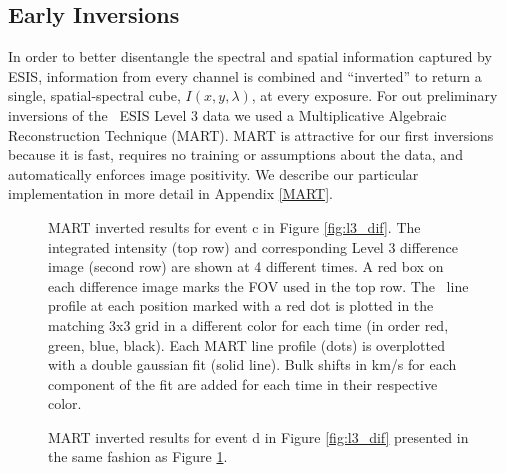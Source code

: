     
    \subsection{Early Inversions} \label{sec:inversions}
    	In order to better disentangle the spectral and spatial information captured by ESIS, information from every channel is combined and ``inverted'' to return a single, spatial-spectral cube, $I(x,y,\lambda)$, at every exposure.
    	For out preliminary inversions of the \ov \  ESIS Level 3 data we used a Multiplicative Algebraic Reconstruction Technique (MART).
    	MART is attractive for our first inversions because it is fast, requires no training or assumptions about the data, and automatically enforces image  positivity.
    	We describe our particular implementation in more detail in Appendix \ref{MART}.
    	
    	\begin{figure}[htb!]
    		\centering
    		\caption{MART inverted results for event c in Figure \ref{fig:l3_dif}. The integrated intensity (top row) and corresponding Level 3 difference image (second row) are shown at 4 different times. A red box on each difference image marks the FOV used in the top row.  The \ov \ line profile at each position marked with a red dot is plotted in the matching 3x3 grid in a different color for each time (in order red, green, blue, black). Each MART line profile (dots) is overplotted with a double gaussian fit (solid line).  Bulk shifts in km/s for each component of the fit are added for each time in their respective color. }
    		\label{fig:perfect_x_inverted}
    	\end{figure}
        
        \begin{figure}[htb!]
    	\centering
    	\caption{MART inverted results for event d in Figure \ref{fig:l3_dif} presented in the same fashion as Figure \ref{fig:perfect_x_inverted}.}
    	\label{fig:other_x_inverted}
    	\end{figure}
    	
